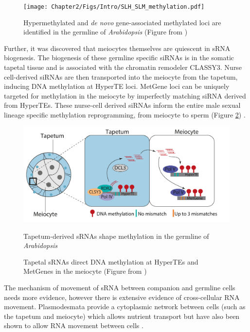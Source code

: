 \begin{figure}[htbp!] 
\centering    
    \texttt{[image: Chapter2/Figs/Intro/SLH\_SLM\_methylation.pdf]}
\caption{Hypermethylated and \textit{de novo} gene-associated methylated loci are identified in the germline of \textit{Arabidopsis} (Figure from \cite{RN199})}
\label{fig:SLH_SLM}
\captionsetup{font=small}
    \caption*{}
\end{figure}

Further, it was discovered that meiocytes themselves are quiescent in sRNA biogenesis. The biogenesis of these germline specific siRNAs is in the somatic tapetal tissue and is associated with the chromatin remodeler CLASSY3. Nurse cell-derived siRNAs are then transported into the meiocyte from the tapetum, inducing DNA methylation at HyperTE loci. MetGene loci can be uniquely targeted for methylation in the meiocyte by imperfectly matching siRNA derived from HyperTEs. These nurse-cell derived siRNAs inform the entire male sexual lineage specific methylation reprogramming, from meiocyte to sperm (Figure \ref{fig:Jincheng_abstract}) \cite{RN187}.

\begin{figure}[htbp!] 
\centering    
        \includegraphics[width=1\textwidth]{Chapter2/Figs/Intro/Jincheng_paper_abstract.pdf}
\caption{Tapetum-derived sRNAs shape methylation in the germline of \textit{Arabidopsis}}
\label{fig:Jincheng_abstract}
\captionsetup{font=small}
    \caption*{Tapetal sRNAs direct DNA methylation at HyperTEs and MetGenes in the meiocyte (Figure from \cite{RN187})}
\end{figure}

The mechanism of movement of sRNA between companion and germline cells needs more evidence, however there is extensive evidence of cross-cellular RNA movement. Plasmodesmata provide a cytoplasmic network between cells (such as the tapetum and meiocyte) which allows nutrient transport but have also been shown to allow RNA movement between cells \cite{RN130,RN132,RN128}.

